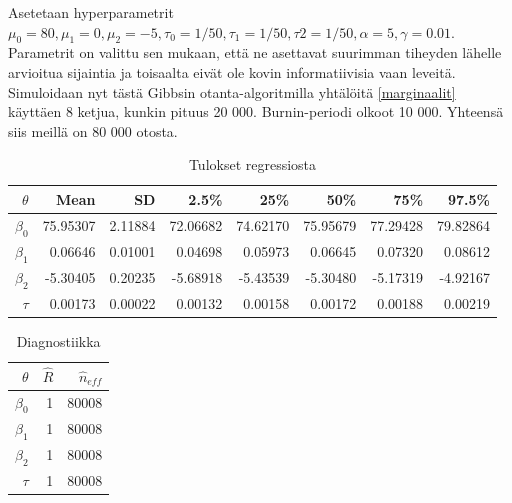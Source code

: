 Asetetaan hyperparametrit $\mu_0 = 80,\mu_1 = 0, \mu_2 = -5, \tau_0 = 1/50, \tau_1 = 1/50, \tau2 = 1/50, \alpha	= 5, \gamma = 0.01$. Parametrit on valittu sen mukaan, että ne asettavat suurimman tiheyden lähelle arvioitua sijaintia ja toisaalta eivät ole kovin informatiivisia vaan leveitä. Simuloidaan nyt tästä Gibbsin otanta-algoritmilla yhtälöitä \ref{marginaalit} käyttäen 8 ketjua, kunkin pituus 20 000. Burnin-periodi olkoot 10 000. Yhteensä siis meillä on 80 000 otosta.

\begin{table}[ht]
\centering
\label{results}
\begin{tabular}{rrrrrrrr}
  \hline
 $\theta$ & Mean & SD & 2.5\% & 25\% & 50\% & 75\% & 97.5\% \\ 
  \hline
  $\beta_0$ & 75.95307 & 2.11884 & 72.06682 & 74.62170 & 75.95679 & 77.29428 & 79.82864 \\ 
  $\beta_1$ & 0.06646 & 0.01001 & 0.04698 & 0.05973 & 0.06645 & 0.07320 & 0.08612 \\ 
  $\beta_2$ & -5.30405 & 0.20235 & -5.68918 & -5.43539 & -5.30480 & -5.17319 & -4.92167 \\ 
  $\tau$ & 0.00173 & 0.00022 & 0.00132 & 0.00158 & 0.00172 & 0.00188 & 0.00219 \\ 
   \hline
\end{tabular}
\caption{Tulokset regressiosta}
\end{table}
\begin{table}[ht]\label{diagnostics}
\centering
\begin{tabular}{rrr}
  \hline
 $\theta$ & $\hat{R}$ & $\hat{n}_{eff}$ \\ 
  \hline
  $\beta_0$ & 1 & 80008 \\ 
  $\beta_1$ & 1 & 80008 \\ 
  $\beta_2$ & 1 & 80008  \\ 
  $\tau$ & 1 & 80008  \\ 
   \hline
\end{tabular}
\caption{Diagnostiikka}
\end{table}

